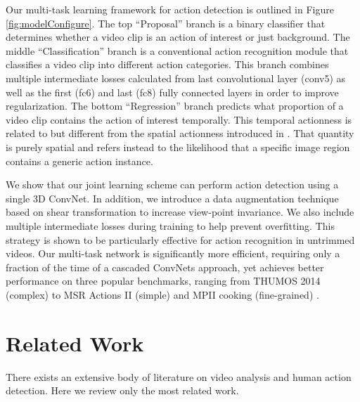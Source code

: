 \documentclass[10pt,twocolumn,letterpaper]{article}
\begin{document}
Our multi-task learning framework for action detection is outlined in Figure \ref{fig:modelConfigure}. 
The top ``Proposal'' branch is a binary classifier that determines whether a video clip is an action of interest or just background. 
The middle ``Classification'' branch is a conventional action recognition module that classifies a video clip into different action categories. 
This branch combines multiple intermediate losses calculated from last convolutional layer (\textsf{conv5}) as well as the first (\textsf{fc6}) and last (\textsf{fc8}) fully connected layers in order to improve regularization.
The bottom ``Regression'' branch predicts what proportion of a video clip contains the action of interest temporally. This temporal actionness is related to but different from the spatial actionness introduced in \cite{actionness_cvpr14_chen}. That quantity is purely spatial and refers instead to the likelihood that a specific image region contains a generic action instance. 

We show that our joint learning scheme can perform action detection using a single 3D ConvNet. 
In addition, we introduce a data augmentation technique based on shear transformation to increase view-point invariance. 
We also include multiple intermediate losses during training to help prevent overfitting. This strategy is shown to be particularly effective for action recognition in untrimmed videos. Our multi-task network is significantly more efficient, requiring only a fraction of the time of a cascaded ConvNets approach, yet achieves better performance on three popular benchmarks, ranging from THUMOS 2014 (complex) \cite{THUMOS14} to MSR Actions II (simple) \cite{MSR_action_II_PAMI11} and MPII cooking (fine-grained) \cite{MPII_cooking_cvpr12}.

\section{Related Work}
\label{sec:related}
There exists an extensive body of literature on video analysis and human action detection. Here we review only the most related work.
\end{document}
